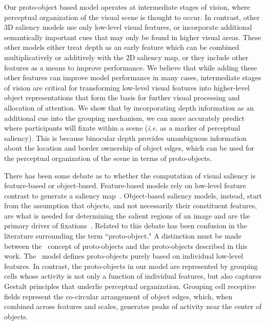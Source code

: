 \documentclass[12pt]{article}
\newcommand{\ie}[0]{{\em i.e.}\xspace}
\newcommand{\eg}[0]{{\em e.g.}\xspace}
\begin{document}
Our proto-object based model operates at intermediate stages of
vision, where perceptual organization of the visual scene is thought
to occur. In contrast, other 3D saliency models use only low-level
visual features, or incorporate additional semantically important cues
that may only be found in higher visual areas. These other models
either treat depth as an early feature which can be combined
multiplicatively or additively with the 2D saliency map, or they
include other features \citep[such as human face and body
detection,][]{Cerf_etal08} as a means to improve performance.  We
believe that while adding these other features can improve model
performance in many cases, intermediate stages of vision are critical
for transforming low-level visual features into higher-level object
representations that form the basis for further visual processing and
allocation of attention.  We show that by incorporating depth
information as an additional cue into the grouping mechanism, we can
more accurately predict where participants will fixate within a scene
(\ie as a marker of perceptual saliency). This is because binocular
depth provides unambiguous information about the location and border
ownership of object edges, which can be used for the perceptual
organization of the scene in terms of proto-objects.
 
There has been some debate as to whether the computation of visual
saliency is feature-based or object-based. Feature-based models
rely on low-level feature contrast to generate a saliency map~\citep[\eg][]{Itti_etal98a,Walther_Koch06}. Object-based
saliency models, instead, start from the assumption that objects, and
not necessarily their constituent features, are what is needed for
determining the salient regions of an image and are the primary driver
of fixations~\citep{Einhauser_etal08a,Nuthman_Henderson10,Stoll_etal15}.
Related to this debate has been confusion in the literature surrounding the
term ``proto-object." A distinction must be made between
the~\cite{Walther_Koch06} concept of proto-objects and the
proto-objects described in this work. The~\cite{Walther_Koch06} model
defines proto-objects purely based on
individual low-level features.
In contrast, the proto-objects in our
model are represented by grouping cells whose activity is not only a
function of individual features, but also captures Gestalt principles that underlie perceptual organization. Grouping cell receptive fields represent the co-circular arrangement of object edges, which, when combined across features and scales, generates peaks of activity near the center of objects.
\end{document}
